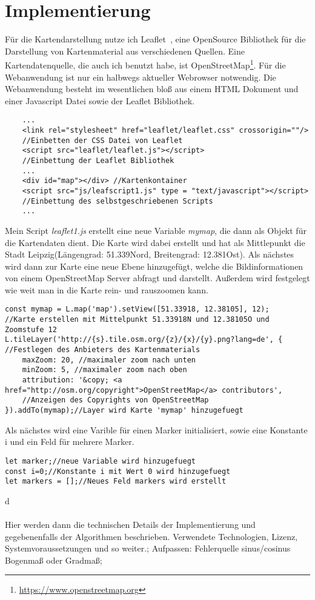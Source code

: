 \documentclass[a4paper, twoside, 12pt]{scrreprt}
\begin{document}
\chapter{Implementierung}
Für die Kartendarstellung nutze ich Leaflet~\citep{crickard2014leaflet}, eine OpenSource Bibliothek für die Darstellung von Kartenmaterial aus verschiedenen Quellen. Eine Kartendatenquelle, die auch ich benutzt habe, ist OpenStreetMap\footnote{\url{https://www.openstreetmap.org}}.
Für die Webanwendung ist nur ein halbwegs aktueller Webrowser notwendig.
Die Webanwendung besteht im wesentlichen bloß aus einem HTML Dokument und einer Javascript Datei sowie der Leaflet Bibliothek.
\begin{lstlisting}
	...
	<link rel="stylesheet" href="leaflet/leaflet.css" crossorigin=""/>
	//Einbetten der CSS Datei von Leaflet
	<script src="leaflet/leaflet.js"></script>
	//Einbettung der Leaflet Bibliothek
	...
	<div id="map"></div> //Kartenkontainer
	<script src="js/leafscript1.js" type = "text/javascript"></script>
	//Einbettung des selbstgeschriebenen Scripts
	...
\end{lstlisting}
Mein Script \textit{leaflet1.js} erstellt eine neue Variable \textit{mymap}, die dann als Objekt für die Kartendaten dient.
Die Karte wird dabei erstellt und hat als Mittlepunkt die Stadt Leipzig(Längengrad: 51.339\textdegree Nord, Breitengrad: 12.381\textdegree Ost).
Als nächstes wird dann zur Karte eine neue Ebene hinzugefügt, welche die Bildinformationen von einem OpenStreetMap Server abfragt und darstellt.
Außerdem wird festgelegt wie weit man in die Karte rein- und rauszoomen kann.
\lstset{language=Java}
\begin{lstlisting}
const mymap = L.map('map').setView([51.33918, 12.38105], 12);
//Karte erstellen mit Mittelpunkt 51.33918N und 12.38105O und Zoomstufe 12
L.tileLayer('http://{s}.tile.osm.org/{z}/{x}/{y}.png?lang=de', {
//Festlegen des Anbieters des Kartenmaterials
	maxZoom: 20, //maximaler zoom nach unten
	minZoom: 5, //maximaler zoom nach oben
	attribution: '&copy; <a href="http://osm.org/copyright">OpenStreetMap</a> contributors',
	//Anzeigen des Copyrights von OpenStreetMap
}).addTo(mymap);//Layer wird Karte 'mymap' hinzugefuegt
\end{lstlisting}
Als nächstes wird eine Varible für einen Marker initialisiert, sowie eine Konstante i und ein Feld für mehrere Marker.
\begin{lstlisting}
let marker;//neue Variable wird hinzugefuegt
const i=0;//Konstante i mit Wert 0 wird hinzugefuegt
let markers = [];//Neues Feld markers wird erstellt
\end{lstlisting}
d
\\\\Hier werden dann die technischen Details der Implementierung und gegebenenfalls der Algorithmen beschrieben.
Verwendete Technologien, Lizenz, Systemvoraussetzungen und so weiter.;
Aufpassen: Fehlerquelle sinus/cosinus Bogenmaß oder Gradmaß;
\end{document}
